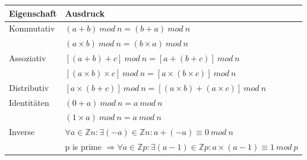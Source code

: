 \documentclass[a4paper]{article}
\begin{document}
\begin{multicols}{3}
      \begin{tabular}{l|l}
            Eigenschaft & Ausdruck                                                                                                          \\\hline
            Kommutativ  & $(a + b)\ mod\ n = (b+ a)\ mod\ n$                                                                                \\
                        & $(a \times b)\ mod\ n = (b \times a)\ mod\ n$                                                                     \\
            Assoziativ  & $[(a + b) + c]\ mod\ n =[a + (b + c)]\ mod\ n$                                                                    \\
                        & $[(a \times b) \times c]\ mod\ n =[a \times (b \times c)]\ mod\ n$                                                \\
            Distributiv & $[a \times (b + c)]\ mod\ n =[(a \times b) + (a \times c)]\ mod\ n$                                               \\
            Identitäten & $(0 + a)\ mod\ n = a\ mod\ n$                                                                                     \\
                        & $(1 \times a)\ mod\ n = a\ mod\ n$                                                                                \\
            Inverse     & $\forall a \in \mathbb{Z}n: \exists (-a)\in \mathbb{Z}n : a + (-a) \equiv 0\ mod\ n$                              \\
                        & p is prime $\Rightarrow \forall a\in \mathbb{Z}p: \exists (a-1) \in \mathbb{Z}p: a \times (a-1) \equiv 1\ mod\ p$
      \end{tabular}


\end{multicols}
\end{document}
